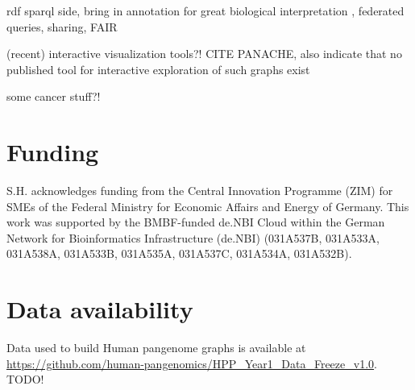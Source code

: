 \documentclass{bioinfo}
\begin{document}
rdf sparql side, bring in annotation for great biological interpretation \cite{Yokoyama2020}, federated queries, sharing, FAIR

(recent) interactive visualization tools?! CITE PANACHE, also indicate that no published tool for interactive exploration of such graphs exist

some cancer stuff?!

\section*{Funding}

S.H. acknowledges funding from the Central Innovation Programme (ZIM) for SMEs of the Federal Ministry for Economic Affairs and Energy of Germany.
This work was supported by the BMBF-funded de.NBI Cloud within the German Network for Bioinformatics Infrastructure (de.NBI) (031A537B, 031A533A, 031A538A, 031A533B, 031A535A, 031A537C, 031A534A, 031A532B).

\section*{Data availability}

Data used to build Human pangenome graphs is available at \url{https://github.com/human-pangenomics/HPP_Year1_Data_Freeze_v1.0}.
TODO!


%
%
%
%
%
%
%







\end{document}
